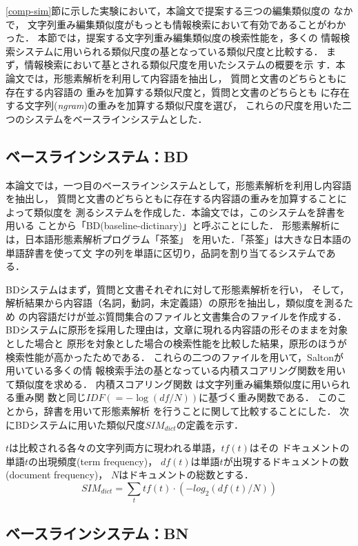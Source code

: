\ref{comp-sim}節に示した実験において，本論文で提案する三つの編集類似度の
なかで，
文字列重み編集類似度がもっとも情報検索において有効であることがわかった．
本節では，提案する文字列重み編集類似度の検索性能を，多くの
情報検索システムに用いられる類似尺度の基となっている類似尺度と比較する．
まず，情報検索において基とされる類似尺度を用いたシステムの概要を示
す．本論文では，形態素解析を利用して内容語を抽出し，
質問と文書のどちらともに存在する内容語の
重みを加算する類似尺度と，質問と文書のどちらとも
に存在する文字列({\it ngram})の重みを加算する類似尺度を選び，
これらの尺度を用いた二つのシステムをベースラインシステムとした．

\subsection{ベースラインシステム：BD}

本論文では，一つ目のベースラインシステムとして，形態素解析を利用し内容語を抽出し，
質問と文書のどちらともに存在する内容語の重みを加算することによって類似度を
測るシステムを作成した．本論文では，このシステムを辞書を用いる
ことから「BD(baseline-dictinary)」と呼ぶことにした．
形態素解析には，日本語形態素解析プログラム「茶筌」
\cite{Matsumoto97}を用いた．「茶筌」は大きな日本語の単語辞書を使って文
字の列を単語に区切り，品詞を割り当てるシステムである．

BDシステムはまず，質問と文書それぞれに対して形態素解析を行い，
そして，解析結果から内容語（名詞，動詞，未定義語）の原形を抽出し，類似度を測るため
の内容語だけが並ぶ質問集合のファイルと文書集合のファイルを作成する．
BDシステムに原形を採用した理由は，文章に現れる内容語の形そのままを対象とした場合と
原形を対象とした場合の検索性能を比較した結果，原形のほうが検索性能が高かったためである．
これらの二つのファイルを用いて，Salton\cite{Salton88}が用いている多くの情
報検索手法の基となっている内積スコアリング関数を用いて類似度を求める．
内積スコアリング関数
は文字列重み編集類似度に用いられる重み関
数と同じ$IDF(=-\log(df/N))$に基づく重み関数である．
このことから，辞書を用いて形態素解析
を行うことに関して比較することにした．
次にBDシステムに用いた類似尺度$SIM_{dict}$の定義を示す．
\begin{df}
$t$は比較される各々の文字列両方に現われる単語，$tf(t)$はその
ドキュメントの単語$t$の出現頻度(term frequency)，
$df(t)$は単語$t$が出現するドキュメントの数(document frequency)，
$N$はドキュメントの総数とする．
\[ SIM_{dict} = \sum_{t} tf(t) \cdot (- log_2(df(t) / N)) \]
\end{df}

\subsection{ベースラインシステム：BN}

